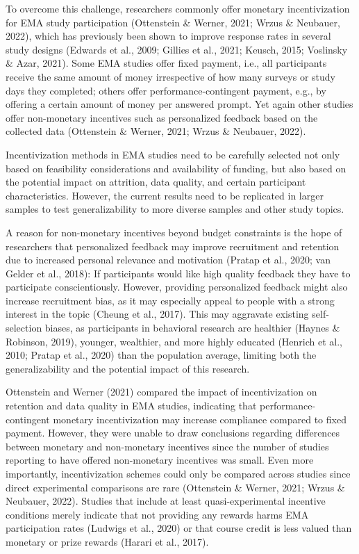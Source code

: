 \documentclass[authordate, empirical]{jote-new-article}
\begin{document}
	To overcome this challenge, researchers commonly offer monetary incentivization for EMA study participation (Ottenstein \& Werner, 2021; Wrzus \& Neubauer, 2022), which has previously been shown to improve response rates in several study designs (Edwards et al., 2009; Gillies et al., 2021; Keusch, 2015; Voslinsky \& Azar, 2021). Some EMA studies offer fixed payment, i.e., all participants receive the same amount of money irrespective of how many surveys or study days they completed; others offer performance-contingent payment, e.g., by offering a certain amount of money per answered prompt. Yet again other studies offer non-monetary incentives such as personalized feedback based on the collected data (Ottenstein \& Werner, 2021; Wrzus \& Neubauer, 2022).


	\begin{takeHomeMessage}
		Incentivization methods in EMA studies need to be carefully selected not only based on feasibility considerations and availability of funding, but also based on the potential impact on attrition, data quality, and certain participant characteristics. However, the current results need to be replicated in larger samples to test generalizability to more diverse samples and other study topics.
	
	\end{takeHomeMessage}

	A reason for non-monetary incentives beyond budget constraints is the hope of researchers that personalized feedback may improve recruitment and retention due to increased personal relevance and motivation (Pratap et al., 2020; van Gelder et al., 2018): If participants would like high quality feedback they have to participate conscientiously. However, providing personalized feedback might also increase recruitment bias, as it may especially appeal to people with a strong interest in the topic (Cheung et al., 2017). This may aggravate existing self-selection biases, as participants in behavioral research are healthier (Haynes \& Robinson, 2019), younger, wealthier, and more highly educated (Henrich et al., 2010; Pratap et al., 2020) than the population average, limiting both the generalizability and the potential impact of this research.



	Ottenstein and Werner (2021) compared the impact of incentivization on retention and data quality in EMA studies, indicating that performance-contingent monetary incentivization may increase compliance compared to fixed payment. However, they were unable to draw conclusions regarding differences between monetary and non-monetary incentives since the number of studies reporting to have offered non-monetary incentives was small. Even more importantly, incentivization schemes could only be compared across studies since direct experimental comparisons are rare (Ottenstein \& Werner, 2021; Wrzus \& Neubauer, 2022). Studies that include at least quasi-experimental incentive conditions merely indicate that not providing any rewards harms EMA participation rates (Ludwigs et al., 2020) or that course credit is less valued than monetary or prize rewards (Harari et al., 2017).
\end{document}
